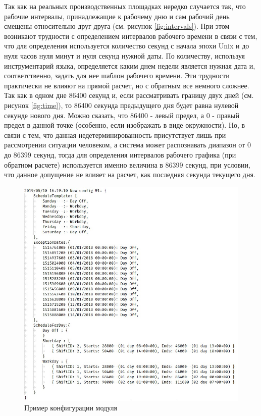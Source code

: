 \indent Так как на реальных производственных площадках нередко случается так, что рабочие интервалы, принадлежащие к рабочему дню и сам рабочий день смещены относительно друг друга (см. рисунок \ref{fig:intervals}).
При этом возникают трудности с определением интервалов рабочего времени в связи с тем, что для определения используется количество секунд с начала эпохи Unix и до нуля часов нуля минут и нуля секунд нужной даты.
По количеству, используя инструментарий языка, определяется каким днем недели является нужная дата и, соответственно, задать для нее шаблон рабочего времени.
Эти трудности практически не влияют на прямой расчет, но с обратным все немного сложнее.
Так как в одном дне 86400 секунд и, если рассматривать границу двух дней (см. рисунок \ref{fig:time}), то 86400 секунда предыдущего дня будет равна нулевой секунде нового дня.
Можно сказать, что 86400 - левый предел, а 0 - правый предел в данной точке (особенно, если изображать в виде окружности).
Но, в связи с тем, что данная недетерминированность присутствует лишь при рассмотрении ситуации человеком, а система может распознавать диапазон от 0 до 86399 секунд, тогда для определения интервалов рабочего графика (при обратном расчете) используется именно величина в 86399 секунд, при условии, что данное допущение не влияет на расчет, как последняя секунда текущего дня.

\begin{figure}[h!]
	\centering
	\includegraphics[scale=0.6]{pics/scheduleConfigExample.png}
	\caption{Пример конфигурации модуля}
	\label{fig:config}
\end{figure}

